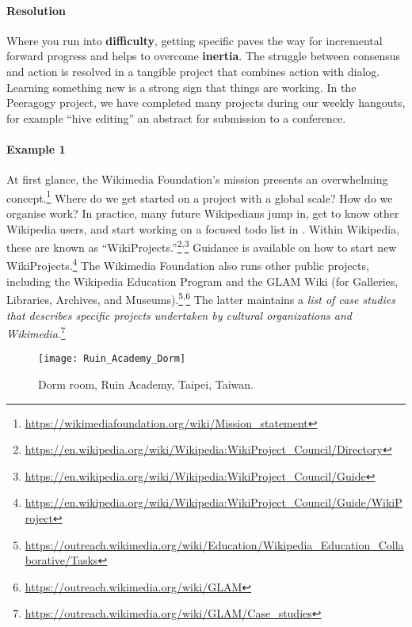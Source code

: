 \begin{refsection}
\paragraph{Resolution}
Where you run into \textbf{difficulty}, getting specific paves the way for incremental forward progress and helps to overcome \textbf{inertia}. The struggle between consensus and action is resolved in a tangible project that combines action with dialog. Learning something new is a strong sign that things are working.
In the Peeragogy project, we have completed many projects during our weekly hangouts, for example ``hive editing'' an abstract for submission to a conference.

\paragraph{Example 1}
At first glance, the Wikimedia Foundation's mission presents an overwhelming concept.\footnote{\url{https://wikimediafoundation.org/wiki/Mission_statement}} Where do we get started on a project with a global scale? How do we organise work?
In practice, many future Wikipedians jump in, get to know other Wikipedia users, and start working on a focused todo list in
.
Within Wikipedia, these are known as ``WikiProjects.''\footnote{\url{https://en.wikipedia.org/wiki/Wikipedia:WikiProject_Council/Directory}}\textsuperscript{,}\footnote{\url{https://en.wikipedia.org/wiki/Wikipedia:WikiProject_Council/Guide}}
Guidance is available on how to start new WikiProjects.\footnote{\url{https://en.wikipedia.org/wiki/Wikipedia:WikiProject_Council/Guide/WikiProject}}
The Wikimedia Foundation also runs other public projects, including the Wikipedia Education Program and the GLAM Wiki (for Galleries, Libraries, Archives, and Museums).\footnote{\url{https://outreach.wikimedia.org/wiki/Education/Wikipedia_Education_Collaborative/Tasks}}\textsuperscript{,}\footnote{\url{https://outreach.wikimedia.org/wiki/GLAM}}  The latter maintains a \emph{list of case studies that describes specific projects undertaken by cultural organizations and Wikimedia}.\footnote{\url{https://outreach.wikimedia.org/wiki/GLAM/Case_studies}}

\begin{wrapfigure}{r}{.47\textwidth}
\vspace{-.2cm}
\begin{center}
\texttt{[image: Ruin\_Academy\_Dorm]}
\end{center}
\vspace{-.3cm}
\caption{Dorm room, Ruin Academy, Taipei, Taiwan. 
\label{dormitory}
}
\vspace{-0cm}
\end{wrapfigure}


\end{refsection}
